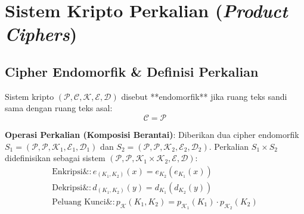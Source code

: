\documentclass[11pt,a4paper]{article}
\begin{document}
\section{Sistem Kripto Perkalian (\textit{Product Ciphers})}

\subsection{Cipher Endomorfik \& Definisi Perkalian}
Sistem kripto $(\mathcal{P}, \mathcal{C}, \mathcal{K}, \mathcal{E}, \mathcal{D})$ disebut **endomorfik** jika ruang teks sandi sama dengan ruang teks asal:
\begin{equation}
\mathcal{C} = \mathcal{P}
\end{equation}

\noindent\textbf{Operasi Perkalian (Komposisi Berantai)}:
Diberikan dua cipher endomorfik $S_1 = (\mathcal{P}, \mathcal{P}, \mathcal{K}_1, \mathcal{E}_1, \mathcal{D}_1)$ dan $S_2 = (\mathcal{P}, \mathcal{P}, \mathcal{K}_2, \mathcal{E}_2, \mathcal{D}_2)$. Perkalian $S_1 \times S_2$ didefinisikan sebagai sistem $(\mathcal{P}, \mathcal{P}, \mathcal{K}_1 \times \mathcal{K}_2, \mathcal{E}, \mathcal{D})$:
\begin{align}
\label{eq:product_enc}
\text{Enkripsi}\&: e_{(K_1, K_2)}(x) = e_{K_2}(e_{K_1}(x)) \\
\label{eq:product_dec}
\text{Dekripsi}\&: d_{(K_1, K_2)}(y) = d_{K_1}(d_{K_2}(y)) \\
\label{eq:product_prob}
\text{Peluang Kunci}\&: p_{\mathcal{K}}(K_1, K_2) = p_{\mathcal{K}_1}(K_1) \cdot p_{\mathcal{K}_2}(K_2)
\end{align}
\end{document}
